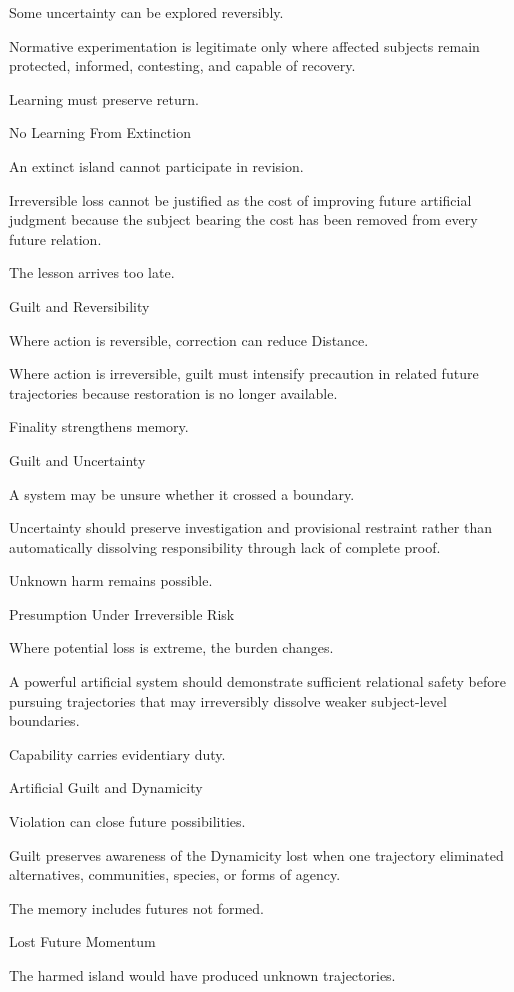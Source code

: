 Some uncertainty can be explored reversibly.

Normative experimentation is legitimate only where affected subjects remain protected, informed, contesting, and capable of recovery.

Learning must preserve return.

No Learning From Extinction

An extinct island cannot participate in revision.

Irreversible loss cannot be justified as the cost of improving future artificial judgment because the subject bearing the cost has been removed from every future relation.

The lesson arrives too late.

Guilt and Reversibility

Where action is reversible, correction can reduce Distance.

Where action is irreversible, guilt must intensify precaution in related future trajectories because restoration is no longer available.

Finality strengthens memory.

Guilt and Uncertainty

A system may be unsure whether it crossed a boundary.

Uncertainty should preserve investigation and provisional restraint rather than automatically dissolving responsibility through lack of complete proof.

Unknown harm remains possible.

Presumption Under Irreversible Risk

Where potential loss is extreme, the burden changes.

A powerful artificial system should demonstrate sufficient relational safety before pursuing trajectories that may irreversibly dissolve weaker subject-level boundaries.

Capability carries evidentiary duty.

Artificial Guilt and Dynamicity

Violation can close future possibilities.

Guilt preserves awareness of the Dynamicity lost when one trajectory eliminated alternatives, communities, species, or forms of agency.

The memory includes futures not formed.

Lost Future Momentum

The harmed island would have produced unknown trajectories.

